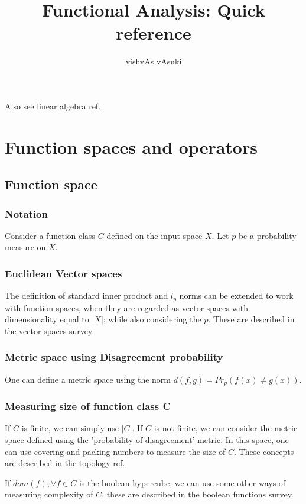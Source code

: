 \documentclass[oneside, article]{memoir}
\title{Functional Analysis: Quick reference}
\author{vishvAs vAsuki}
\begin{document}
\maketitle


Also see linear algebra ref.

\part{Function spaces and operators}
\chapter{Function space}
\section{Notation}
Consider a function class $C$ defined on the input space $X$. Let $p$ be a probability measure on $X$.

\section{Euclidean Vector spaces}
The definition of standard inner product and $l_p$ norms can be extended to work with function spaces, when they are regarded as vector spaces with dimensionality equal to $|X|$; while also considering the $p$. These are described in the vector spaces survey.

\section{Metric space using Disagreement probability}
One can define a metric space using the norm $d(f, g) = Pr_p(f(x) \neq g(x))$.

\section{Measuring size of function class C}
If $C$ is finite, we can simply use $|C|$. If $C$ is not finite, we can consider the metric space defined using the 'probability of disagreement' metric. In this space, one can use covering and packing numbers to measure the size of $C$. These concepts are described in the topology ref.

If $dom(f), \forall f \in C$ is the boolean hypercube, we can use some other ways of measuring complexity of $C$, these are described in the boolean functions survey.
\end{document}
